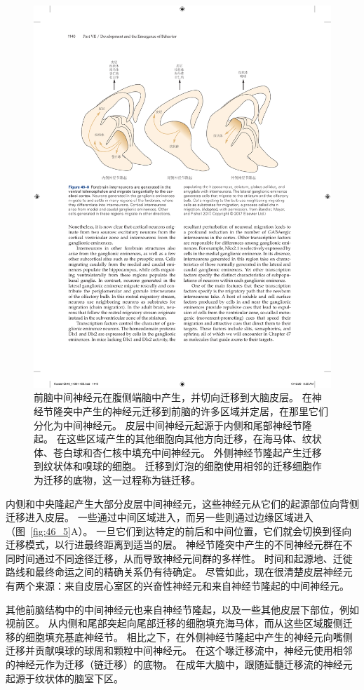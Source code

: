 \begin{figure}[htbp]
	\centering
	\includegraphics[width=0.8\linewidth]{chap46/fig_46_8}
	\caption{前脑中间神经元在腹侧端脑中产生，并切向迁移到大脑皮层。
		在神经节隆突中产生的神经元迁移到前脑的许多区域并定居，在那里它们分化为中间神经元。
		皮层中间神经元起源于内侧和尾部神经节隆起。
		在这些区域产生的其他细胞向其他方向迁移，在海马体、纹状体、苍白球和杏仁核中填充中间神经元。
		外侧神经节隆起产生迁移到纹状体和嗅球的细胞。
		迁移到灯泡的细胞使用相邻的迁移细胞作为迁移的底物，这一过程称为链迁移\cite{bandler2017cortical}。}
	\label{fig:46_8}
\end{figure}


内侧和中央隆起产生大部分皮层中间神经元，这些神经元从它们的起源部位向背侧迁移进入皮层。
一些通过中间区域进入，而另一些则通过边缘区域进入（图~\ref{fig:46_5}A）。
一旦它们到达特定的前后和中间位置，它们就会切换到径向迁移模式，以行进最终距离到适当的层。
神经节隆突中产生的不同神经元群在不同时间通过不同途径迁移，从而导致神经元间群的多样性。
时间和起源地、迁徙路线和最终命运之间的精确关系仍有待确定。
尽管如此，现在很清楚皮层神经元有两个来源：来自皮层心室区的兴奋性神经元和来自神经节隆起的中间神经元。


其他前脑结构中的中间神经元也来自神经节隆起，以及一些其他皮层下部位，例如视前区。
从内侧和尾部突起向尾部迁移的细胞填充海马体，而从这些区域腹侧迁移的细胞填充基底神经节。
相比之下，在外侧神经节隆起中产生的神经元向嘴侧迁移并贡献嗅球的球周和颗粒中间神经元。
在这个喙迁移流中，神经元使用相邻的神经元作为迁移（链迁移）的底物。
在成年大脑中，跟随延髓迁移流的神经元起源于纹状体的脑室下区。


